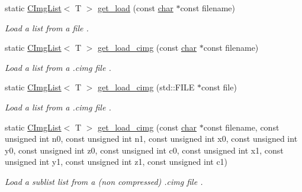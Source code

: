 \begin{DoxyCompactItemize}
static \hyperlink{structcimg__library__suffixed_1_1CImgList}{C\+Img\+List}$<$ T $>$ \hyperlink{structcimg__library__suffixed_1_1CImgList_aa6103709b1dee0aec2a199650a1c0c5d}{get\+\_\+load} (const \hyperlink{classchar}{char} $\ast$const filename)
\begin{DoxyCompactList}\small\item\em Load a list from a file . \end{DoxyCompactList}\item 
\mbox{\label{structcimg__library__suffixed_1_1CImgList_af6a6ba5e4f2632969ca3dd7261bad2a6}} 
static \hyperlink{structcimg__library__suffixed_1_1CImgList}{C\+Img\+List}$<$ T $>$ \hyperlink{structcimg__library__suffixed_1_1CImgList_af6a6ba5e4f2632969ca3dd7261bad2a6}{get\+\_\+load\+\_\+cimg} (const \hyperlink{classchar}{char} $\ast$const filename)
\begin{DoxyCompactList}\small\item\em Load a list from a .cimg file . \end{DoxyCompactList}\item 
\mbox{\label{structcimg__library__suffixed_1_1CImgList_a9f035a4d721bfb452ddc1dd3dbd948a0}} 
static \hyperlink{structcimg__library__suffixed_1_1CImgList}{C\+Img\+List}$<$ T $>$ \hyperlink{structcimg__library__suffixed_1_1CImgList_a9f035a4d721bfb452ddc1dd3dbd948a0}{get\+\_\+load\+\_\+cimg} (std\+::\+F\+I\+LE $\ast$const file)
\begin{DoxyCompactList}\small\item\em Load a list from a .cimg file . \end{DoxyCompactList}\item 
\mbox{\label{structcimg__library__suffixed_1_1CImgList_abda6bb08bcaf317533e4e11b9511b8d6}} 
static \hyperlink{structcimg__library__suffixed_1_1CImgList}{C\+Img\+List}$<$ T $>$ \hyperlink{structcimg__library__suffixed_1_1CImgList_abda6bb08bcaf317533e4e11b9511b8d6}{get\+\_\+load\+\_\+cimg} (const \hyperlink{classchar}{char} $\ast$const filename, const unsigned int n0, const unsigned int n1, const unsigned int x0, const unsigned int y0, const unsigned int z0, const unsigned int c0, const unsigned int x1, const unsigned int y1, const unsigned int z1, const unsigned int c1)
\begin{DoxyCompactList}\small\item\em Load a sublist list from a (non compressed) .cimg file . \end{DoxyCompactList}\item 

\end{DoxyCompactItemize}
